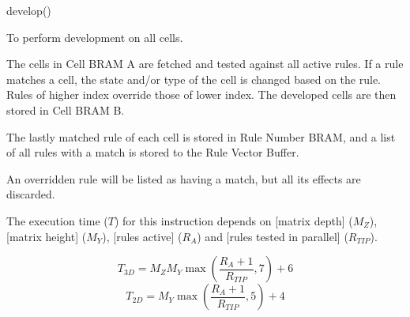 

\format

develop()

\purpose

To perform development on all cells.

\description

The cells in Cell BRAM A are fetched and tested against all active rules.
If a rule matches a cell, the state and/or type of the cell is changed based on the rule.
Rules of higher index override those of lower index.
The developed cells are then stored in Cell BRAM B.

The lastly matched rule of each cell is stored in Rule Number BRAM, and a list of all rules with a match is stored to the Rule Vector Buffer.

\notes

An overridden rule will be listed as having a match, but all its effects are discarded.

The execution time ($T$) for this instruction depends on [matrix depth] ($M_Z$), [matrix height] ($M_Y$), [rules active] ($R_A$) and [rules tested in parallel] ($R_{TIP}$).

$$ T_{3D} = M_Z M_Y \max \left( \frac{ R_A + 1 }{ R_{TIP} }, 7 \right) + 6 $$
$$ T_{2D} = M_Y \max \left( \frac{ R_A + 1 }{ R_{TIP} }, 5 \right) + 4 $$
